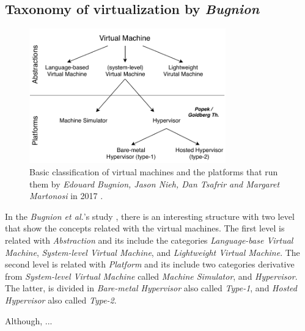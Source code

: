 	\subsection{Taxonomy of virtualization by \textit{Bugnion}}
	
	\begin{figure}[H]
		\centering
		\includegraphics[width=8.5cm]{images/Bugnion2017.pdf}
		\vspace{-0.2cm}
		\caption{Basic classification of virtual machines and the platforms that run them by \textit{Edouard Bugnion, Jason Nieh, Dan Tsafrir and Margaret Martonosi} in 2017 \cite{Bugnion2017}.}
		\label{fig:TaxonomyOfVirtualizationBugnion}
	\end{figure}
	   
    In the \textit{Bugnion et al.}'s study \cite{Bugnion2017}, there is an interesting structure with two level that show the concepts related with the virtual machines. The first level is related with \textit{Abstraction} and its include the categories \textit{Language-base Virtual Machine}, \textit{System-level Virtual Machine}, and \textit{Lightweight Virtual Machine}. The second level is related with \textit{Platform} and its include two categories derivative from \textit{System-level Virtual Machine} called \textit{Machine Simulator}, and \textit{Hypervisor}. The latter, is divided in \textit{Bare-metal Hypervisor} also called \textit{Type-1}, and \textit{Hosted Hypervisor} also called \textit{Type-2}.
    
    
    
    Although,  ...
  
